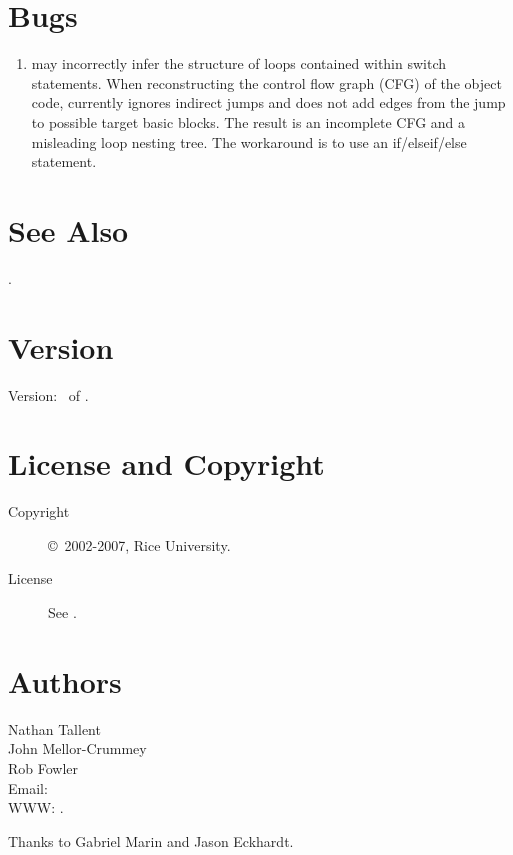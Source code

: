 \documentclass[english]{article}
\begin{document}
\section{Bugs}

\begin{enumerate}

\item {} may incorrectly infer the structure of loops contained within switch statements.
When reconstructing the control flow graph (CFG) of the object code,  currently ignores indirect jumps and does not add edges from the jump to possible target basic blocks.
The result is an incomplete CFG and a misleading loop nesting tree.
The workaround is to use an if/elseif/else statement.

\end{enumerate}

\section{See Also}

.

\section{Version}

Version: \Version\ of \Date.

\section{License and Copyright}

\begin{description}
\item[Copyright] \copyright\ 2002-2007, Rice University.
\item[License] See .
\end{description}

\section{Authors}

\noindent
Nathan Tallent \\
John Mellor-Crummey \\
Rob Fowler \\
Email:  \\
WWW: .

Thanks to Gabriel Marin and Jason Eckhardt.

\LatexManEnd
\end{document}
